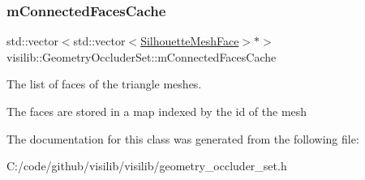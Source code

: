 \subsubsection{\texorpdfstring{mConnectedFacesCache}{mConnectedFacesCache}}
{\footnotesize\ttfamily std\+::vector$<$std\+::vector$<$\mbox{\hyperlink{classvisilib_1_1_silhouette_mesh_face}{Silhouette\+Mesh\+Face}}$>$$\ast$$>$ visilib\+::\+Geometry\+Occluder\+Set\+::m\+Connected\+Faces\+Cache\hspace{0.3cm}{\ttfamily [private]}}



The list of faces of the triangle meshes. 

The faces are stored in a map indexed by the id of the mesh 

The documentation for this class was generated from the following file\+:\begin{DoxyCompactItemize}
\item 
C\+:/code/github/visilib/visilib/geometry\+\_\+occluder\+\_\+set.\+h\end{DoxyCompactItemize}
